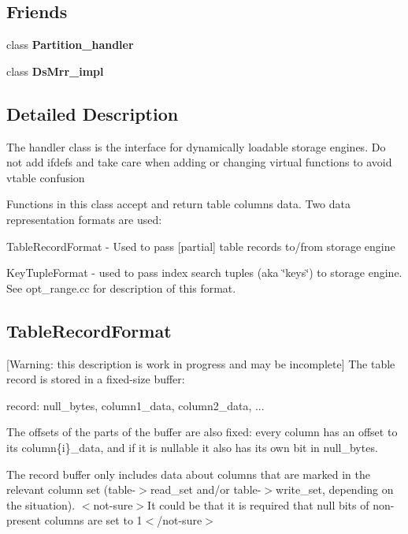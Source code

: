 \subsection*{Friends}
\begin{DoxyCompactItemize}
\item 
\mbox{\label{classhandler_a0e1b518f74dfed5dde6f5f902f264f39}} 
class {\bfseries Partition\+\_\+handler}
\item 
\mbox{\label{classhandler_a576b2e6999b5b4fbe40abb7870fe33b2}} 
class {\bfseries Ds\+Mrr\+\_\+impl}
\end{DoxyCompactItemize}


\subsection{Detailed Description}
The handler class is the interface for dynamically loadable storage engines. Do not add ifdefs and take care when adding or changing virtual functions to avoid vtable confusion

Functions in this class accept and return table columns data. Two data representation formats are used\+:
\begin{DoxyEnumerate}
\item Table\+Record\+Format -\/ Used to pass \mbox{[}partial\mbox{]} table records to/from storage engine
\item Key\+Tuple\+Format -\/ used to pass index search tuples (aka \char`\"{}keys\char`\"{}) to storage engine. See opt\+\_\+range.\+cc for description of this format.
\end{DoxyEnumerate}

\subsection*{Table\+Record\+Format }

\mbox{[}Warning\+: this description is work in progress and may be incomplete\mbox{]} The table record is stored in a fixed-\/size buffer\+:

record\+: null\+\_\+bytes, column1\+\_\+data, column2\+\_\+data, ...

The offsets of the parts of the buffer are also fixed\+: every column has an offset to its column\{i\}\+\_\+data, and if it is nullable it also has its own bit in null\+\_\+bytes.

The record buffer only includes data about columns that are marked in the relevant column set (table-\/$>$read\+\_\+set and/or table-\/$>$write\+\_\+set, depending on the situation). $<$not-\/sure$>$It could be that it is required that null bits of non-\/present columns are set to 1$<$/not-\/sure$>$

